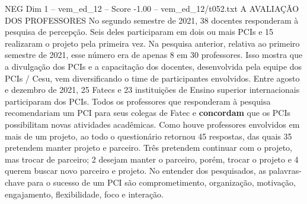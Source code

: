 \begin{textsample}{NEG Dim 1 – vem\_ed\_12 – Score -1.00 – vem\_ed\_12/t052.txt}  \label{ex:f1_neg_010}
A AVALIAÇÃO DOS PROFESSORES No segundo semestre de 2021, 38 docentes responderam à pesquisa de percepção.
Seis deles participaram em dois ou mais PCIs e 15 realizaram o projeto pela primeira vez.
Na pesquisa anterior, relativa ao primeiro semestre de 2021, esse número era de apenas 8 em 30 professores.
Isso mostra que a divulgação dos PCIs e a capacitação dos docentes, desenvolvida pela equipe dos PCIs / Cesu, vem diversificando o time de participantes envolvidos.
Entre agosto e dezembro de 2021, 25 Fatecs e 23 instituições de Ensino superior internacionais participaram dos PCIs.
Todos os professores que responderam à pesquisa recomendariam um PCI para seus colegas de Fatec e \textbf{concordam} que os PCIs possibilitam novas atividades acadêmicas.
Como houve professores envolvidos em mais de um projeto, ao todo o questionário retornou 45 respostas, das quais 35 pretendem manter projeto e parceiro.
Três pretendem continuar com o projeto, mas trocar de parceiro; 2 desejam manter o parceiro, porém, trocar o projeto e 4 querem buscar novo parceiro e projeto.
No entender dos pesquisados, as palavras-chave para o sucesso de um PCI são comprometimento, organização, motivação, engajamento, flexibilidade, foco e interação.

\end{textsample}
